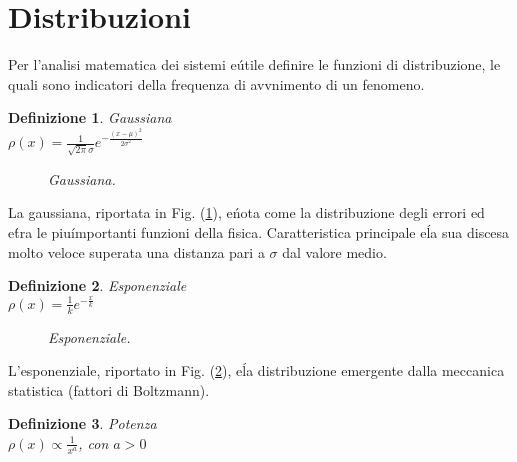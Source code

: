 \documentclass[12pt, a4paper]{book}
\theoremstyle{theorem}
\newtheorem{definition}{Definizione}[section]
\begin{document}
		\section{Distribuzioni}
		Per l'analisi matematica dei sistemi e\' utile definire le funzioni di distribuzione, le quali sono indicatori della frequenza di avvnimento di un fenomeno.
		\begin{definition}
			Gaussiana\\$\rho(x)=\frac{1}{\sqrt{2\pi}\sigma}e^{-\frac{(x-\mu)^2}{2\sigma^2}}$
		\end{definition}
		\begin{figure}[H]
			\centering
			\caption{\emph{Gaussiana.}}
			\label{figure:gaussiana}
		\end{figure}
		La gaussiana, riportata in Fig. (\ref{figure:gaussiana}), e\' nota come la distribuzione degli errori ed e\' tra le piu\' importanti funzioni della fisica.
		Caratteristica principale e\' la sua discesa molto veloce superata una distanza pari a $\sigma$ dal valore medio.
		\begin{definition}
			Esponenziale\\$\rho(x)=\frac{1}{k}e^{-\frac{x}{k}}$
		\end{definition}
		\begin{figure}[H]
			\centering
			\caption{\emph{Esponenziale.}}
			\label{figure:esponenziale}
		\end{figure}
		L'esponenziale, riportato in Fig. (\ref{figure:esponenziale}), e\' la distribuzione emergente dalla meccanica statistica (fattori di Boltzmann).
		\begin{definition}
			Potenza\\$\rho(x)\propto\frac{1}{x^a}$, con $a>0$
		\end{definition}
\end{document}
